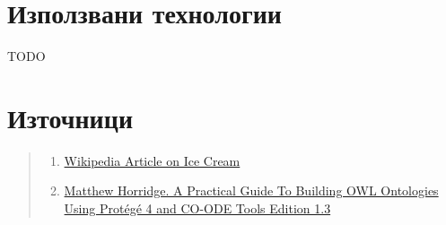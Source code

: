 \documentclass[12pt]{article}
\begin{document}
\section{Използвани технологии}

TODO







\listoffigures

\section{Източници}

\begin{quote}

    \begin{enumerate}
    
    \item \href{https://en.wikipedia.org/wiki/Ice_cream}{Wikipedia Article on Ice Cream}
    
    \item \href{https://www.researchgate.net/publication/272829948_A_Practical_Guide_To_Building_OWL_Ontologies_Using_Protege_4_and_CO-ODE_Tools_Edition_13}{Matthew Horridge. A Practical Guide To Building OWL Ontologies Using Protégé 4 and CO-ODE Tools Edition 1.3}

    
    
    \end{enumerate}

\end{quote}
\end{document}
